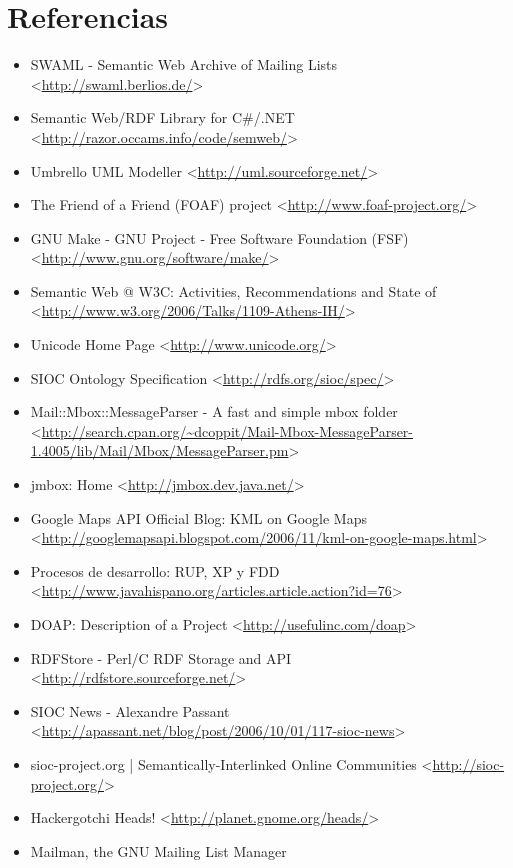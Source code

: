 
\chapter{Referencias}

\begin{itemize}
 \item SWAML - Semantic Web Archive of Mailing Lists
 <\url{http://swaml.berlios.de/}>
 \item Semantic Web/RDF Library for C\#/.NET
 <\url{http://razor.occams.info/code/semweb/}>
 \item Umbrello UML Modeller
 <\url{http://uml.sourceforge.net/}>
 \item The Friend of a Friend (FOAF) project
 <\url{http://www.foaf-project.org/}>
 \item GNU Make - GNU Project - Free Software Foundation (FSF)
 <\url{http://www.gnu.org/software/make/}>
 \item Semantic Web @ W3C: Activities, Recommendations and State of
 <\url{http://www.w3.org/2006/Talks/1109-Athens-IH/}>
 \item Unicode Home Page
 <\url{http://www.unicode.org/}>
 \item SIOC Ontology Specification
 <\url{http://rdfs.org/sioc/spec/}>
 \item Mail::Mbox::MessageParser - A fast and simple mbox folder
 <\url{http://search.cpan.org/~dcoppit/Mail-Mbox-MessageParser-1.4005/lib/Mail/Mbox/MessageParser.pm}>
 \item jmbox: Home
 <\url{http://jmbox.dev.java.net/}>
 \item Google Maps API Official Blog: KML on Google Maps
 <\url{http://googlemapsapi.blogspot.com/2006/11/kml-on-google-maps.html}>
 \item Procesos de desarrollo: RUP, XP y FDD
 <\url{http://www.javahispano.org/articles.article.action?id=76}>
 \item DOAP: Description of a Project
 <\url{http://usefulinc.com/doap}>
 \item RDFStore - Perl/C RDF Storage and API
 <\url{http://rdfstore.sourceforge.net/}>
 \item SIOC News - Alexandre Passant
 <\url{http://apassant.net/blog/post/2006/10/01/117-sioc-news}>
 \item sioc-project.org | Semantically-Interlinked Online Communities
 <\url{http://sioc-project.org/}>
 \item Hackergotchi Heads!
 <\url{http://planet.gnome.org/heads/}>
 \item Mailman, the GNU Mailing List Manager

\end{itemize}
